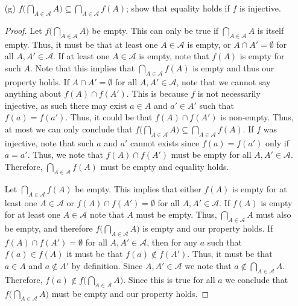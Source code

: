 \documentclass[12pt]{article}
\begin{document}
\begin{enumerate}
\begin{proof}
		Let $x \in \bigcup_{A \in \mathcal{A}} f(A)$. By definition, 
		$x \in f(A)$ for at least one $A \in \mathcal{A}$, let $A$ be such set.
		Thus, there exists at least one $a \in A$ such that $f(a) = x$.
		Note that since $a \in A$ and $A \in \mathcal{A}$, it must be that 
		$a \in \bigcup_{A \in \mathcal{A}} A$. Therefore, 
		$x = f(a) \in f\big(\bigcup_{A \in \mathcal{A}} A\big)$.
		Thus, we conclude that $f\big(\bigcup_{A \in \mathcal{A}} A\big) = 
		\bigcup_{A \in \mathcal{A}} f(A)$.
	\end{proof}
	\item[(g)] $f\big(\bigcap_{A \in \mathcal{A}} A\big) \subseteq 
	\bigcap_{A \in \mathcal{A}} f(A)$; show that equality holds if $f$ is injective.
	\begin{proof}
		Let $f\big(\bigcap_{A \in \mathcal{A}} A\big)$ be empty. This can only be
		true if $\bigcap_{A \in \mathcal{A}} A$ is itself empty. Thus, it must be 
		that at least one $A \in \mathcal{A}$ is empty, or $A \cap A' = \emptyset$
		for all $A, A' \in \mathcal{A}$. If at least one $A \in \mathcal{A}$ is empty,
		note that $f(A)$ is empty for such $A$. Note that this implies that 
		$\bigcap_{A \in \mathcal{A}} f(A)$ is empty and thus our property holds.
		If $A \cap A' = \emptyset$ for all $A, A' \in \mathcal{A}$, note that we 
		cannot say anything about $f(A) \cap f(A')$. This is because $f$ is not 
		necessarily injective, as such there may exist $a \in A$ and $a' \in A'$
		such that $f(a) = f(a')$. Thus, it could be that $f(A) \cap f(A')$ is non-empty.
		Thus, at most we can only conclude that $f\big(\bigcap_{A \in \mathcal{A}} A\big)
		\subseteq \bigcap_{A \in \mathcal{A}} f(A)$. If $f$ was injective,
		note that such $a$ and $a'$ cannot exists since $f(a) = f(a')$ only if 
		$a = a'$. Thus, we note that $f(A) \cap f(A')$ must be empty for 
		all $A, A' \in \mathcal{A}$. Therefore, $\bigcap_{A \in \mathcal{A}} f(A)$
		must be empty and equality holds.
		
		Let $\bigcap_{A \in \mathcal{A}} f(A)$ be empty. This implies that 
		either $f(A)$ is empty for at least one $A \in \mathcal{A}$ or 
		$f(A) \cap f(A') = \emptyset$ for all $A, A' \in \mathcal{A}$.
		If $f(A)$ is empty for at least one $A \in \mathcal{A}$ note that 
		$A$ must be empty. Thus, $\bigcap_{A \in \mathcal{A}} A$ must also be empty,
		and therefore $f\big(\bigcap_{A \in \mathcal{A}} A\big)$ is empty and 
		our property holds. If $f(A) \cap f(A') = \emptyset$ for all $A, A' \in \mathcal{A}$,
		then for any $a$ such that $f(a) \in f(A)$ it must be that $f(a) \notin f(A')$.
		Thus, it must be that $a \in A$ and $a \notin A'$ by definition. Since 
		$A, A' \in \mathcal{A}$ we note that $a \notin \bigcap_{A \in \mathcal{A}} A$.
		Therefore, $f(a) \notin f\big(\bigcap_{A \in \mathcal{A}} A\big)$. Since this 
		is true for all $a$ we conclude that $f\big(\bigcap_{A \in \mathcal{A}} A\big)$
		must be empty and our property holds.
		

\end{proof}
\end{enumerate}
\end{document}
